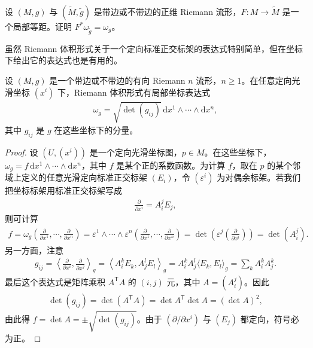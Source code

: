 \documentclass[../../main.tex]{subfiles}
\begin{document}
\begin{exercise}\label{exercise:ch15-30}
设 $(M,g)$ 与 $(\widetilde M,\widetilde g)$ 是带边或不带边的正维 Riemann 流形，$F:M\to\widetilde M$ 是一个局部等距。证明 $F^*\omega_{\widetilde g}=\omega_g$。
\end{exercise}

虽然 Riemann 体积形式关于一个定向标准正交标架的表达式特别简单，但在坐标下给出它的表达式也是有用的。

\begin{proposition}\label{proposition:ch15-volume-coords}
设 $(M,g)$ 是一个带边或不带边的有向 Riemann $n$ 流形，$n\geqslant1$。在任意定向光滑坐标 $(x^i)$ 下，Riemann 体积形式有局部坐标表达式
\begin{align*}
\omega_g=\sqrt{\det(g_{ij})}\,\mathrm{d}x^1\wedge\cdots\wedge\mathrm{d}x^n,
\end{align*}
其中 $g_{ij}$ 是 $g$ 在这些坐标下的分量。
\end{proposition}

\begin{proof}
设 $(U,(x^i))$ 是一个定向光滑坐标图，$p\in M$。在这些坐标下，$\omega_g=f\,\mathrm{d}x^1\wedge\cdots\wedge\mathrm{d}x^n$，其中 $f$ 是某个正的系数函数。为计算 $f$，取在 $p$ 的某个邻域上定义的任意光滑定向标准正交标架 $(E_i)$，令 $(\varepsilon^i)$ 为对偶余标架。若我们把坐标标架用标准正交标架写成
\begin{align*}
\frac{\partial}{\partial x^i}=A^j_iE_j,
\end{align*}
则可计算
\begin{align*}
f=\omega_g\left(\frac{\partial}{\partial x^1},\cdots ,\frac{\partial}{\partial x^n}\right)
=\varepsilon^1\wedge\cdots\wedge\varepsilon^n\left(\frac{\partial}{\partial x^1},\cdots ,\frac{\partial}{\partial x^n}\right)
=\det\left(\varepsilon^j\left(\frac{\partial}{\partial x^i}\right)\right)
=\det(A^j_i).
\end{align*}
另一方面，注意
\begin{align*}
g_{ij}=\left\langle\frac{\partial}{\partial x^i},\frac{\partial}{\partial x^j}\right\rangle_g
=\left\langle A^k_iE_k,A^l_jE_l\right\rangle_g
=A^k_iA^l_j\langle E_k,E_l\rangle_g
=\sum_k A^k_iA^k_j.
\end{align*}
最后这个表达式是矩阵乘积 $A^{\mathsf T}A$ 的 $(i,j)$ 元，其中 $A=(A^j_i)$。因此
\begin{align*}
\det(g_{ij})=\det(A^{\mathsf T}A)=\det A^{\mathsf T}\det A=(\det A)^2,
\end{align*}
由此得 $f=\det A=\pm\sqrt{\det(g_{ij})}$。由于 $(\partial/\partial x^i)$ 与 $(E_j)$ 都定向，符号必为正。
\end{proof}
\end{document}
